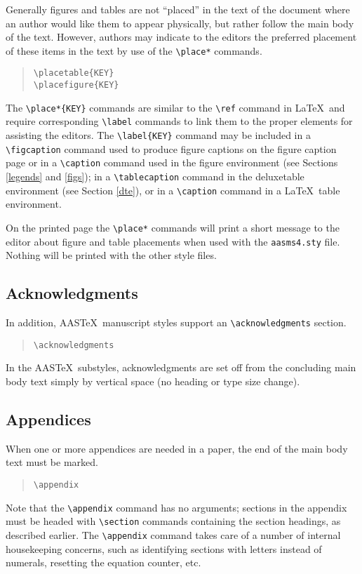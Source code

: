 Generally figures and tables are not ``placed'' in the text of the document
where an author would like them to appear physically, but rather follow the
main body of the text.
However, authors may indicate to the editors the preferred placement of these 
items in the text by use of the \verb"\place*" commands.
\begin{quote}
\verb"\placetable{KEY}"\\
\verb"\placefigure{KEY}"
\end{quote}
The \verb"\place*{KEY}" commands are similar to the \verb"\ref" command
in La\TeX\
and require corresponding \verb"\label" commands to link them to the
proper elements for assisting the editors.   The \verb"\label{KEY}" command
may be included in a \verb"\figcaption" command used to produce figure
captions on the figure caption page or in a
\verb"\caption" command used in the figure environment (see 
Sections \ref{legends} and \ref{figs}); in a \verb"\tablecaption" 
command in the deluxetable 
environment (see Section \ref{dte}), or in a 
\verb"\caption" command in a La\TeX\ table environment.

On the printed page the \verb"\place*" commands will print a short message to 
the editor about figure and table placements when used with the 
{\tt aasms4.sty} file.  Nothing will be 
printed with the other style files.


\subsection{Acknowledgments}

In addition, AAS\TeX\ manuscript styles support an
\verb"\acknowledgments" section.
\begin{quote}
\verb"\acknowledgments"
\end{quote}
In the AAS\TeX\ substyles, acknowledgments are set off from the
concluding main body text simply by vertical space
(no heading or type size change).

\subsection{Appendices}

When one or more appendices are needed in a paper, the end of the
main body text must be marked.
\begin{quote}
\verb"\appendix"
\end{quote}
Note that the \verb"\appendix" command has no arguments;
sections in the appendix must be headed with \verb"\section"
commands containing the section headings, as described earlier.
The \verb"\appendix" command takes care of a number of internal
housekeeping concerns, such as identifying sections with letters
instead of numerals, resetting the equation counter, etc.

